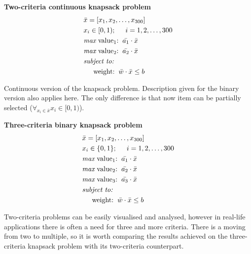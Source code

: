 \begin{description}
  \item{\textbf{Two-criteria continuous knapsack problem}}
    \begin{align*}
      & \bar{x} = [x_1, x_2, \dots, x_{300}]  \\
      & x_i \in [0, 1);  \hspace{0.5cm} i = 1, 2, \dots, 300 \\
      & \textit{max}\text{ value$_1$:} \hspace{0.2cm} \bar{a_1} \cdot \bar{x} \\
      & \textit{max}\text{ value$_2$:} \hspace{0.2cm} \bar{a_2} \cdot \bar{x} \\
      & \textit{subject to:} \\
      & \hspace{0.5cm} \text{weight:}  \hspace{0.2cm} \bar{w} \cdot \bar{x} \leq b
    \end{align*}

    Continuous version of the knapsack problem. Description given for the
    binary version also applies here. The only difference is that now item can
    be partially selected ($\forall_{x_i \in \bar{x}} x_i \in [0, 1)$). 

  \item{\textbf{Three-criteria binary knapsack problem}}
    \begin{align*}
      & \bar{x} = [x_1, x_2, \dots, x_{300}]  \\
      & x_i \in \{0, 1\};  \hspace{0.5cm} i = 1, 2, \dots, 300 \\
      & \textit{max}\text{ value$_1$:} \hspace{0.2cm} \bar{a_1} \cdot \bar{x} \\
      & \textit{max}\text{ value$_2$:} \hspace{0.2cm} \bar{a_2} \cdot \bar{x} \\
      & \textit{max}\text{ value$_3$:} \hspace{0.2cm} \bar{a_3} \cdot \bar{x} \\
      & \textit{subject to:} \\
      & \hspace{0.5cm} \text{weight:} \hspace{0.2cm} \bar{w} \cdot \bar{x} \leq b
    \end{align*}

    Two-criteria problems can be easily visualised and analysed, however in
    real-life applications there is often a need for three and more
    criteria. There is a moving from two to multiple, so it is worth comparing
    the results achieved on the three-criteria knapsack problem with its
    two-criteria counterpart. 


\end{description}
